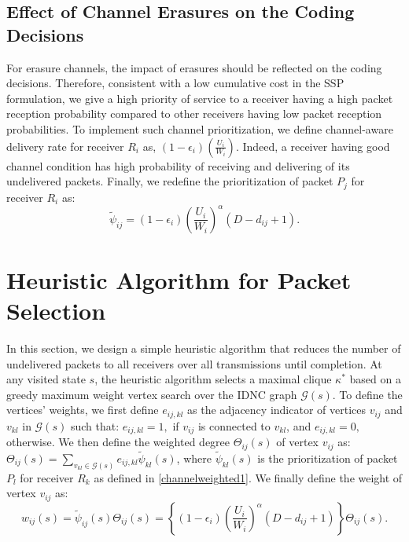 \documentclass[12pt, peerreview, onecolumn]{IEEEtran}
\begin{document}
\subsection{Effect of  Channel Erasures  on the Coding Decisions}
For erasure channels,  the impact of  erasures should be reflected on the coding decisions. Therefore,  consistent with a low cumulative cost in the SSP formulation, we  give  a high priority of service  to  a receiver having a high packet reception probability compared to other receivers having low packet reception probabilities. To implement such channel prioritization, we define channel-aware delivery rate for receiver $R_i$ as, $(1-\epsilon_i)\left(\frac{U_i}{W_i}\right)$. Indeed, a receiver having good channel condition has high probability of receiving  and delivering  of its undelivered packets. Finally, we redefine the  prioritization of packet $P_j$ for receiver $R_i$ as:
\begin{equation} \label{channelweighted1}
\tilde{\psi}_{ij} = (1-\epsilon_i)\left(\frac{U_i}{W_i}\right)^{\alpha}(D - d_{ij} +1).
\end{equation}

\vspace{-5mm}
\section{Heuristic Algorithm for Packet Selection} \label{heuristic}
In this section, we  design a simple  heuristic algorithm that reduces the  number of undelivered packets to all receivers over all transmissions until completion. At any visited state $s$,  the heuristic algorithm selects a maximal clique $\kappa^*$ based on a greedy  maximum weight vertex search over the IDNC graph $\mathcal{G}(s)$.  To define the vertices' weights, we first define $e_{ij,kl}$ as the adjacency indicator of vertices $v_{ij}$ and $v_{kl}$ in $\mathcal{G}(s)$ such that:  $e_{ij,kl} = 1,$ if $v_{ij}$ is connected to $v_{kl}$,  and  $e_{ij,kl} = 0,$ otherwise.
We then define the weighted degree $\Theta_{ij}(s)$ of  vertex $v_{ij}$  as: $\Theta_{ij}(s) = \sum_{v_{kl} \in \mathcal{G}(s)} e_{ij,kl} \tilde{\psi}_{kl}(s)$, where $\tilde{\psi}_{kl}(s)$ is the prioritization of packet $P_l$ for receiver $R_k$ as defined in \eqref{channelweighted1}.   We finally define  the weight  of vertex $v_{ij}$ as:
\begin{equation}\label{w:weight}
w_{ij}(s) = \tilde{\psi}_{ij}(s) \Theta_{ij}(s) = \left\{(1-\epsilon_i)\left(\frac{U_i}{W_i}\right)^{\alpha} (D - d_{ij} +1)\right\} \Theta_{ij}(s).
\end{equation}
\end{document}
